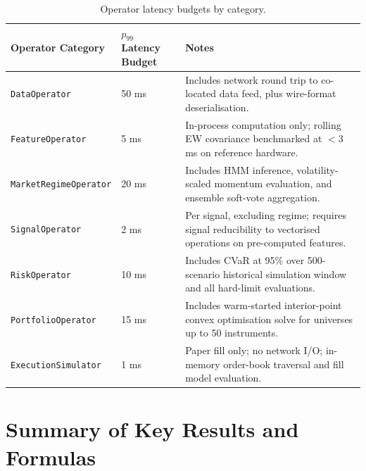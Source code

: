 \documentclass[12pt,openany]{book}
\numberwithin{equation}{chapter}
\theoremstyle{plain}
\theoremstyle{definition}
\theoremstyle{remark}
\begin{document}
\begin{table}[H]
\centering
\caption{Operator latency budgets by category.}
\label{tab:latency_budgets}
\small
\begin{tabularx}{\textwidth}{p{4.5cm} p{4.5cm} p{5.5cm}}
\toprule
\textbf{Operator Category} & \textbf{$p_{99}$ Latency Budget} & \textbf{Notes} \\
\midrule
\texttt{DataOperator} & 50 ms & Includes network round trip to co-located data feed, plus wire-format deserialisation. \\
\texttt{FeatureOperator} & 5 ms & In-process computation only; rolling EW covariance benchmarked at $<$3 ms on reference hardware. \\
\texttt{MarketRegimeOperator} & 20 ms & Includes HMM inference, volatility-scaled momentum evaluation, and ensemble soft-vote aggregation. \\
\texttt{SignalOperator} & 2 ms & Per signal, excluding regime; requires signal reducibility to vectorised operations on pre-computed features. \\
\texttt{RiskOperator} & 10 ms & Includes CVaR at 95\% over 500-scenario historical simulation window and all hard-limit evaluations. \\
\texttt{PortfolioOperator} & 15 ms & Includes warm-started interior-point convex optimisation solve for universes up to 50 instruments. \\
\texttt{ExecutionSimulator} & 1 ms & Paper fill only; no network I/O; in-memory order-book traversal and fill model evaluation. \\
\bottomrule
\end{tabularx}
\end{table}

\chapter{Summary of Key Results and Formulas}
\end{document}
